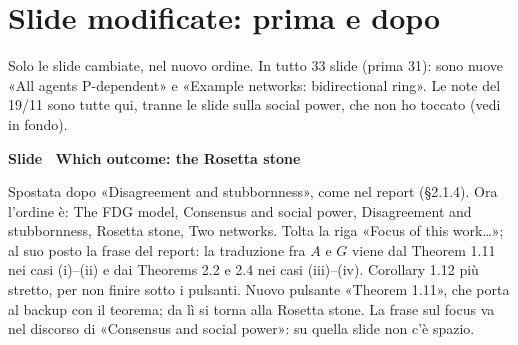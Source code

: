 \section*{Slide modificate: prima e dopo}
Solo le slide cambiate, nel nuovo ordine. In tutto 33 slide (prima 31): sono nuove «All agents P-dependent» e «Example networks: bidirectional ring». Le note del 19/11 sono tutte qui, tranne le slide sulla social power, che non ho toccato (vedi in fondo).
\par\addvspace{14pt}\noindent\begin{minipage}{\textwidth}
{\color{unipd}\bfseries Slide  \textperiodcentered\ Which outcome: the Rosetta stone}\spostata\par\smallskip
{\small Spostata dopo «Disagreement and stubbornness», come nel report (§2.1.4). Ora l'ordine è: The FDG model, Consensus and social power, Disagreement and stubbornness, Rosetta stone, Two networks. Tolta la riga «Focus of this work…»; al suo posto la frase del report: la traduzione fra $A$ e $G$ viene dal Theorem 1.11 nei casi (i)--(ii) e dai Theorems 2.2 e 2.4 nei casi (iii)--(iv). Corollary 1.12 più stretto, per non finire sotto i pulsanti. Nuovo pulsante «Theorem 1.11», che porta al backup con il teorema; da lì si torna alla Rosetta stone. La frase sul focus va nel discorso di «Consensus and social power»: su quella slide non c'è spazio.}\par\smallskip
\noindent\begin{minipage}[t]{0.36\textwidth}\par
{}\par\smallskip
\end{minipage}\hfill\begin{minipage}[t]{0.61\textwidth}\par
{}\par\smallskip
\end{minipage}\par
\end{minipage}\par
